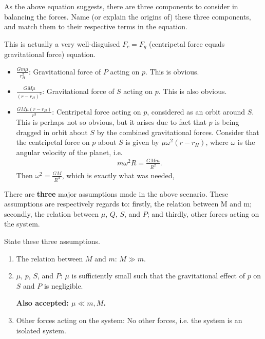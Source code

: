 \documentclass[a4paper,11pt]{exam}
\begin{document}
\begin{questions}
\question[1.5]\label{4a}
	As the above equation suggests, there are three components to consider in balancing the forces. Name (or explain the origins of) these three components, and match them to their respective terms in the equation.
	\droppoints
	\begin{solution}
		This is actually a very well-disguised $F_c = F_g$ (centripetal force equals gravitational force) equation.
		
		\begin{itemize}
			\item $\frac{Gm\mu}{r_H^2}$: Gravitational force of $P$ acting on $p$. This is obvious.
			\item $\frac{GM\mu}{(r-r_H)^2}$: Gravitational force of $S$ acting on $p$. This is also obvious.
			\item $\frac{GM\mu(r-r_H)}{r^3}$: Centripetal force acting on $p$, considered as an orbit around $S$. This is perhaps not so obvious, but it arises due to fact that $p$ is being dragged in orbit about $S$ by the combined gravitational forces. Consider that the centripetal force on $p$ about $S$ is given by $\mu \omega^2 (r-r_H)$, where $\omega$ is the angular velocity of the planet, i.e.
			\begin{align*}
			m\omega^2 R = \frac{GMm}{R^2}.
			\end{align*}
			Then $\omega^2 = \frac{GM}{R^3}$, which is exactly what was needed,
		\end{itemize}
	\end{solution}
	
\filbreak
\question[1.5]
	There are \textbf{three} major assumptions made in the above scenario. These assumptions are respectively regards to: firstly, the relation between M and m; secondly, the relation between $ \mu $, $ Q $, $ S $, and $ P $; and thirdly, other forces acting on the system.
	
	State these three assumptions.
	\droppoints
	\begin{solution}
		\begin{enumerate}[leftmargin=13pt]
			\item The relation between $M$ and $m$: $M \gg m$.
			\item $\mu$, $p$, $S$, and $P$: $\mu$ is sufficiently small such that the gravitational effect of $p$ on $S$ and $P$ is negligible.
			
			\textbf{Also accepted: $\mu \ll m, M$.}
			\item Other forces acting on the system: No other forces, i.e. the system is an isolated system.
		\end{enumerate}
	\end{solution}
	

\end{questions}
\end{document}
